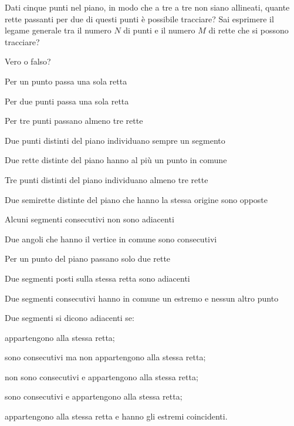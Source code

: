 \begin{esercizio}
\label{ese:1.48}
Dati cinque punti nel piano, in modo che a tre a tre non siano allineati, quante rette passanti per due di questi punti è possibile tracciare? Sai esprimere il legame generale tra il numero $N$ di punti e il numero $M$ di rette che si possono tracciare?
\end{esercizio}

\begin{esercizio}
\label{ese:1.49}
Vero o falso?
\begin{enumeratea}
\item Per un punto passa una sola retta		\hfill\boxV\quad\boxF
\item Per due punti passa una sola retta		\hfill\boxV\quad\boxF
\item Per tre punti passano almeno tre rette	\hfill\boxV\quad\boxF
\item Due punti distinti del piano individuano sempre un segmento	\hfill\boxV\quad\boxF
\item Due rette distinte del piano hanno al più un punto in comune	\hfill\boxV\quad\boxF
\item Tre punti distinti del piano individuano almeno tre rette	\hfill\boxV\quad\boxF
\item Due semirette distinte del piano che hanno la stessa origine sono opposte	\hfill\boxV\quad\boxF
\item Alcuni segmenti consecutivi non sono adiacenti		\hfill\boxV\quad\boxF
\item Due angoli che hanno il vertice in comune sono consecutivi		\hfill\boxV\quad\boxF
\item Per un punto del piano passano solo due rette		\hfill\boxV\quad\boxF
\item Due segmenti posti sulla stessa retta sono adiacenti	\hfill\boxV\quad\boxF
\item Due segmenti consecutivi hanno in comune un estremo e nessun altro punto		\hfill\boxV\quad\boxF
\end{enumeratea}
\end{esercizio}

\begin{esercizio}
\label{ese:1.50}
Due segmenti si dicono adiacenti se:
\begin{enumeratea}
\item appartengono alla stessa retta;
\item sono consecutivi ma non appartengono alla stessa retta;
\item non sono consecutivi e appartengono alla stessa retta;
\item sono consecutivi e appartengono alla stessa retta;
\item appartengono alla stessa retta e hanno gli estremi coincidenti.
\end{enumeratea}
\end{esercizio}

